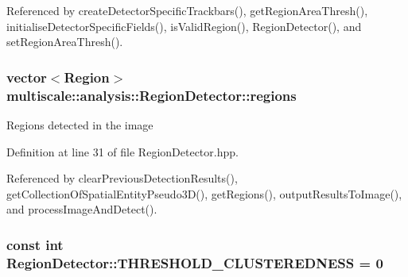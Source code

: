 \-Referenced by create\-Detector\-Specific\-Trackbars(), get\-Region\-Area\-Thresh(), initialise\-Detector\-Specific\-Fields(), is\-Valid\-Region(), \-Region\-Detector(), and set\-Region\-Area\-Thresh().

\hypertarget{classmultiscale_1_1analysis_1_1RegionDetector_aa6517ceb3a58295448d32e6e41499893}{
\subsubsection[{regions}]{\setlength{\rightskip}{0pt plus 5cm}vector$<${\bf \-Region}$>$ {\bf multiscale\-::analysis\-::\-Region\-Detector\-::regions}}}\label{classmultiscale_1_1analysis_1_1RegionDetector_aa6517ceb3a58295448d32e6e41499893}
\-Regions detected in the image 

\-Definition at line 31 of file \-Region\-Detector.\-hpp.



\-Referenced by clear\-Previous\-Detection\-Results(), get\-Collection\-Of\-Spatial\-Entity\-Pseudo3\-D(), get\-Regions(), output\-Results\-To\-Image(), and process\-Image\-And\-Detect().

\hypertarget{classmultiscale_1_1analysis_1_1RegionDetector_a52778f49510e1e500b2dc48857724e20}{
\subsubsection[{\-T\-H\-R\-E\-S\-H\-O\-L\-D\-\_\-\-C\-L\-U\-S\-T\-E\-R\-E\-D\-N\-E\-S\-S}]{\setlength{\rightskip}{0pt plus 5cm}const int {\bf \-Region\-Detector\-::\-T\-H\-R\-E\-S\-H\-O\-L\-D\-\_\-\-C\-L\-U\-S\-T\-E\-R\-E\-D\-N\-E\-S\-S} = 0}}\label{classmultiscale_1_1analysis_1_1RegionDetector_a52778f49510e1e500b2dc48857724e20}


